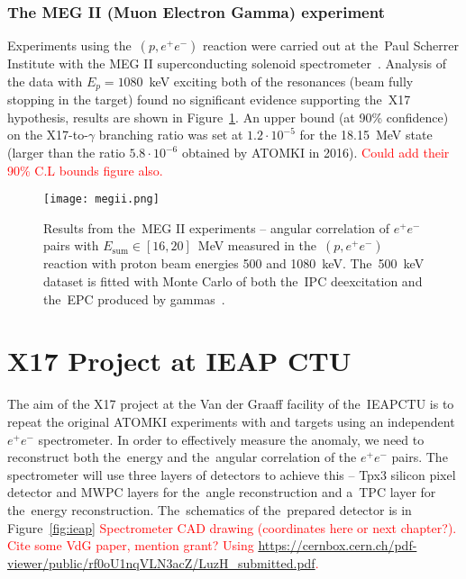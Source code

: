 			\subsubsection{The MEG II (Muon Electron Gamma) experiment}
				Experiments using the~$(p,e^+e^-)$ reaction were carried out at the~Paul Scherrer Institute with the MEG II superconducting solenoid spectrometer~\cite{megii}. Analysis of the data with $E_p = 1080$~keV exciting both of the resonances (beam fully stopping in the target) found no significant evidence supporting the~X17 hypothesis, results are shown in Figure~\ref{fig:megii}. An upper bound (at 90\% confidence) on the X17\nobreakdash-to\nobreakdash-$\gamma$ branching ratio was set at $1.2\cdot10^{-5}$ for the 18.15~MeV state (larger than the ratio $5.8\cdot10^{-6}$ obtained by ATOMKI in 2016). \textcolor{red}{Could add their 90\% C.L bounds figure also.}
				
				\begin{figure}
					\centering
					\texttt{[image: megii.png]}
					\caption{Results from the~MEG II experiments -- angular correlation of $e^+e^-$ pairs with $E_\text{sum} \in [16,20]$~MeV measured in the~$(p,e^+e^-)$ reaction with proton beam energies 500 and 1080~keV. The~500~keV dataset is fitted with Monte Carlo of both the~\ac{IPC} deexcitation and the~\ac{EPC} produced by gammas~\cite{megii}.}
					\label{fig:megii}
				\end{figure}
			
	
	\section{X17 Project at IEAP CTU}
	\label{sec:IEAP}
		The aim of the X17 project at the Van der Graaff facility of the~\acl{IEAPCTU} is to repeat the original ATOMKI experiments with  and  targets using an independent $e^+e^-$ spectrometer. In order to effectively measure the anomaly, we need to reconstruct both the~energy and the~angular correlation of the $e^+e^-$ pairs. The spectrometer will use three layers of detectors to achieve this -- \acf{Tpx3} silicon pixel detector and \acf{MWPC} layers for the~angle reconstruction and a~\acf{TPC} layer for the~energy reconstruction. The~schematics of the~prepared detector is in Figure~\ref{fig:ieap} \textcolor{red}{Spectrometer CAD drawing (coordinates here or next chapter?). Cite some VdG paper, mention grant? Using \url{https://cernbox.cern.ch/pdf-viewer/public/rf0oU1nqVLN3acZ/LuzH_submitted.pdf}.}
			
